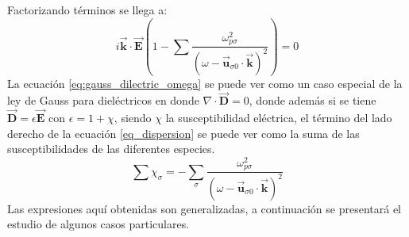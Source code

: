 \documentclass[12pt]{article}
\begin{document}
Factorizando términos se llega a:
\begin{equation}
\label{eq:gauss_dilectric_omega}
i \overrightarrow{\textbf{k}} \cdot \overrightarrow{\textbf{E}} \left( 1 - \sum \frac{\omega_{p \sigma}^2 }{(\omega - \overrightarrow{\textbf{u}}_{\sigma 0} \cdot \overrightarrow{\textbf{k}})^2} \right) = 0
\end{equation}
La ecuación \ref{eq:gauss_dilectric_omega} se puede ver como un caso especial de la ley de Gauss para dieléctricos en donde $\nabla \cdot \overrightarrow{\textbf{D}}=0$, donde además si se tiene $\overrightarrow{\textbf{D}}= \epsilon \overrightarrow{\textbf{E}}$ con $\epsilon = 1+ \chi$, siendo $\chi$ la susceptibilidad eléctrica, el término del lado derecho de la ecuación \ref{eq_dispersion} se puede ver como la suma de las susceptibilidades de las diferentes especies.
\begin{equation}
\label{eq:suma_susceptibilidades}
\sum \chi _\sigma = - \sum_{\sigma} \frac{\omega_{p \sigma}^2}{(\omega - \overrightarrow{\textbf{u}}_{\sigma 0} \cdot \overrightarrow{\textbf{k}})^2}
\end{equation}
Las expresiones aquí obtenidas son generalizadas, a continuación se presentará el estudio de algunos casos particulares.
\end{document}
